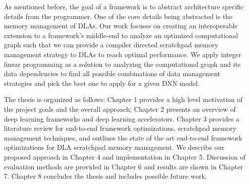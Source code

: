 As mentioned before, the goal of a framework is to abstract architecture
specific details from the programmer. One of the core details being abstracted
is the memory management of DLAs. Our work focuses on creating an
interoperable extension to a framework's middle-end to analyze an optimized
computational graph such that we can provide a compiler directed scratchpad
memory management strategy to DLAs to reach optimal performance. We apply
integer linear programming as a solution to analyzing the computational graph and
its data dependencies to find all possible combinations of data management
strategies and pick the best one to apply for a given DNN model.

The thesis is organized as follows: Chapter 1 provides a high level motivation
of the project goals and the overall approach; Chapter 2 presents an overview
of deep learning frameworks and deep learning accelerators. Chapter 3 provides
a literature review for end-to-end framework optimizations, scratchpad memory
management techniques, and outlines the state of the art end-to-end framework
optimizations for DLA scratchpad memory management. We describe our proposed
approach in Chapter 4 and implementation in Chapter 5. Discussion of evaluation
methods are provided in Chapter 6 and results are shown in Chapter 7. Chapter 8
concludes the thesis and includes possible future work.
